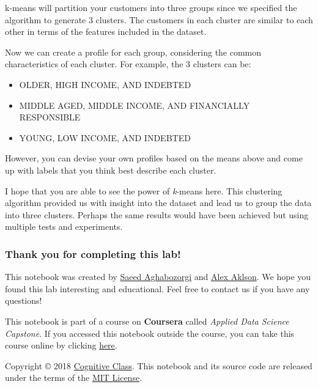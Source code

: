 \documentclass[11pt]{article}
\providecommand{\tightlist}{%
      \setlength{\itemsep}{0pt}\setlength{\parskip}{0pt}}
\begin{document}
    k-means will partition your customers into three groups since we
specified the algorithm to generate 3 clusters. The customers in each
cluster are similar to each other in terms of the features included in
the dataset.

Now we can create a profile for each group, considering the common
characteristics of each cluster. For example, the 3 clusters can be:

\begin{itemize}
\tightlist
\item
  OLDER, HIGH INCOME, AND INDEBTED
\item
  MIDDLE AGED, MIDDLE INCOME, AND FINANCIALLY RESPONSIBLE
\item
  YOUNG, LOW INCOME, AND INDEBTED
\end{itemize}

    However, you can devise your own profiles based on the means above and
come up with labels that you think best describe each cluster.

    I hope that you are able to see the power of \emph{k}-means here. This
clustering algorithm provided us with insight into the dataset and lead
us to group the data into three clusters. Perhaps the same results would
have been achieved but using multiple tests and experiments.

    \hypertarget{thank-you-for-completing-this-lab}{%
\subsubsection{Thank you for completing this
lab!}\label{thank-you-for-completing-this-lab}}

This notebook was created by
\href{https://ca.linkedin.com/in/saeedaghabozorgi}{Saeed Aghabozorgi}
and \href{https://www.linkedin.com/in/aklson/}{Alex Aklson}. We hope you
found this lab interesting and educational. Feel free to contact us if
you have any questions!

    This notebook is part of a course on \textbf{Coursera} called
\emph{Applied Data Science Capstone}. If you accessed this notebook
outside the course, you can take this course online by clicking
\href{http://cocl.us/DP0701EN_Coursera_Week3_LAB1}{here}.

    Copyright © 2018
\href{https://cognitiveclass.ai/?utm_source=bducopyrightlink\&utm_medium=dswb\&utm_campaign=bdu}{Cognitive
Class}. This notebook and its source code are released under the terms
of the \href{https://bigdatauniversity.com/mit-license/}{MIT License}.


    
    
    
\end{document}
